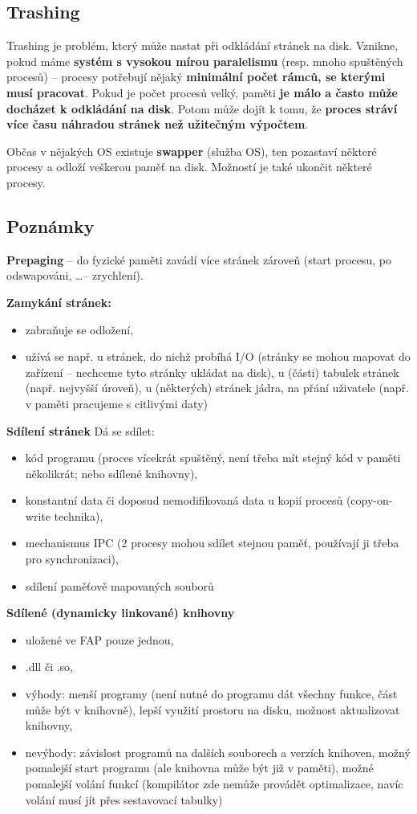 \documentclass[a4paper, 11pt]{article}
\begin{document}
\subsection{Trashing}
Trashing je problém, který může nastat při odkládání stránek na disk. Vznikne, pokud máme \textbf{systém s vysokou mírou paralelismu} (resp. mnoho spuštěných procesů) -- procesy potřebují nějaký \textbf{minimální počet rámců, se kterými musí pracovat}. Pokud je počet procesů velký, paměti \textbf{je málo a často může docházet k odkládání na disk}. Potom může dojít k tomu, že \textbf{proces stráví více času náhradou stránek než užitečným výpočtem}.

Občas v nějakých OS existuje \textbf{swapper} (služba OS), ten pozastaví některé procesy a odloží veškerou paměť na disk. Možností je také ukončit některé procesy.
 
\subsection{Poznámky}
\textbf{Prepaging} -- do fyzické paměti zavádí více stránek zároveň (start procesu, po odswapováni, \ldots -- zrychlení).
 
\textbf{Zamykání stránek:}
\begin{itemize}
    \item zabraňuje se odložení,
    \item užívá se např. u stránek, do nichž probíhá I/O (stránky se mohou mapovat do zařízení -- nechceme tyto stránky ukládat na disk), u (části) tabulek stránek (např. nejvyšší úroveň), u (některých) stránek jádra, na přání uživatele (např. v paměti pracujeme s citlivými daty)
\end{itemize}

\textbf{Sdílení stránek}
Dá se sdílet:
\begin{itemize}
    \item kód programu (proces vícekrát spuštěný, není třeba mít stejný kód v paměti několikrát; nebo sdílené knihovny),
    \item konstantní data či doposud nemodifikovaná data u kopií procesů (copy-on-write technika),
    \item mechanismus IPC (2 procesy mohou sdílet stejnou paměť, používají ji třeba pro synchronizaci),
    \item sdílení paměťově mapovaných souborů
\end{itemize}
 
\textbf{Sdílené (dynamicky linkované) knihovny}
\begin{itemize}
    \item uložené ve FAP pouze jednou,
    \item .dll či .so,
    \item výhody: menší programy (není nutné do programu dát všechny funkce, část může být v knihovně), lepší využití prostoru na disku, možnost aktualizovat knihovny,
    \item nevýhody: závislost programů na dalších souborech a verzích knihoven, možný pomalejší start programu (ale knihovna může být již v paměti), možné pomalejší volání funkcí (kompilátor zde nemůže provádět optimalizace, navíc volání musí jít přes sestavovací tabulky)
\end{itemize}
 
\end{document}
